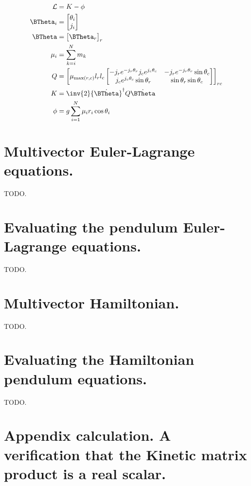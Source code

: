 \begin{align}\label{eqn:sPolarMultiPendulum:zoo20}
\LL &= K - \phi \\
\BTheta_i &=
\begin{bmatrix}
\theta_i \\
j_i
\end{bmatrix} \\
\BTheta &=
{\begin{bmatrix}
\BTheta_r
\end{bmatrix}}_{r} \\
\mu_i &=
\sum_{k=i}^N m_k \\
Q &=
{\begin{bmatrix}
\mu_{\max(r,c)}
l_r l_c
\begin{bmatrix}
- j_r e^{-j_r \theta_r} j_c e^{j_c\theta_c} & - j_r e^{-j_r \theta_r} \sin\theta_c \\
j_c e^{j_c \theta_c} \sin\theta_r & \sin\theta_r \sin\theta_c
\end{bmatrix}
\end{bmatrix}}_{rc} \\
K &=
\inv{2} {\dot{\BTheta}}^\dagger Q \dot{\BTheta} \\
\phi &=
g \sum_{i=1}^N \mu_i r_i \cos\theta_i
\end{align}

\section{Multivector Euler-Lagrange equations.}

TODO.

\section{Evaluating the pendulum Euler-Lagrange equations.}

TODO.

\section{Multivector Hamiltonian.}

TODO.

\section{Evaluating the Hamiltonian pendulum equations.}

TODO.

\section{Appendix calculation.  A verification that the Kinetic matrix product is a real scalar.}

